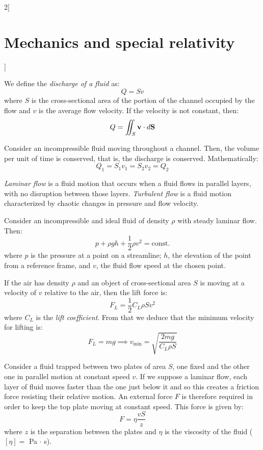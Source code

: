 \documentclass[../../../main.tex]{subfiles}
\begin{document}
\begin{multicols}{2}[\section{Mechanics and special relativity}]
\begin{prop}
  \end{prop}
  \begin{definition}
    We define the \textit{discharge of a fluid} as: $$Q=Sv$$ where $S$ is the cross-sectional area of the portion of the channel occupied by the flow and $v$ is the average flow velocity. If the velocity is not constant, then: $$Q=\iint_S\boldsymbol{\mathrm{v}}\cdot d\boldsymbol{\mathrm{S}}$$
  \end{definition}
  \begin{prop}
    Consider an incompressible fluid moving throughout a channel. Then, the volume per unit of time is conserved, that is, the discharge is conserved. Mathematically: $$Q_1=S_1v_1=S_2v_2=Q_2$$
  \end{prop}
  \begin{definition}
    \textit{Laminar flow} is a fluid motion that occurs when a fluid flows in parallel layers, with no disruption between those layers. \textit{Turbulent flow} is a fluid motion characterized by chaotic changes in pressure and flow velocity.
  \end{definition}
  \begin{center}
    \begin{minipage}{\linewidth}
      \centering
      
    \end{minipage}
  \end{center}
  \begin{prop}
    Consider an incompressible and ideal fluid of density $\rho$ with steady laminar flow. Then: $$p+\rho gh+\frac{1}{2}\rho v^2=\text{const.}$$ where $p$ is the pressure at a point on a streamline; $h$, the elevation of the point from a reference frame, and $v$, the fluid flow speed at the chosen point.
  \end{prop}
  \begin{prop}
    If the air has density $\rho$ and an object of cross-sectional area $S$ is moving at a velocity of $v$ relative to the air, then the lift force is: $$F_L=\frac{1}{2}C_L\rho Sv^2$$ where $C_L$ is the \textit{lift coefficient}. From that we deduce that the minimum velocity for lifting is: $$F_L=mg\implies v_\text{min}=\sqrt{\frac{2mg}{C_L\rho S}}$$
  \end{prop}
  \begin{prop}[Viscosity]
    Consider a fluid trapped between two plates of area $S$, one fixed and the other one in parallel motion at constant speed $v$. If we suppose a laminar flow, each layer of fluid moves faster than the one just below it and so this creates a friction force  resisting their relative motion. An external force $F$ is therefore required in order to keep the top plate moving at constant speed. This force is given by: $$F=\eta\frac{vS}{z}$$ where $z$ is the separation between the plates and $\eta$ is the viscosity of the fluid ($[\eta]=$ Pa $\cdot$ s).

\end{prop}
\end{multicols}
\end{document}
